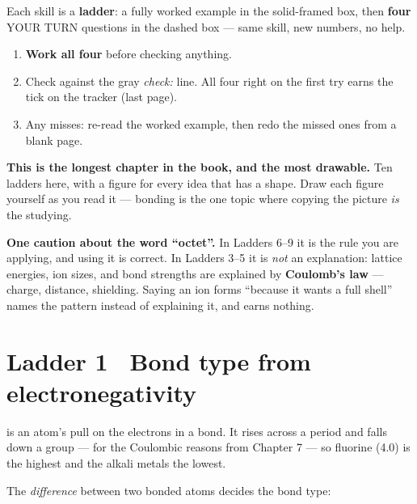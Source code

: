 \documentclass{apchem-worksheet}
\begin{document}
\apctitleblock

\begin{apcnote}
Each skill is a \textbf{ladder}: a fully worked example in the
solid-framed box, then \textbf{four} YOUR TURN questions in the dashed
box --- same skill, new numbers, no help.

\begin{enumerate}[leftmargin=*,itemsep=0.15em]
  \item \textbf{Work all four} before checking anything.
  \item Check against the gray \emph{check:} line. All four right on the
        first try earns the tick on the tracker (last page).
  \item Any misses: re-read the worked example, then redo the missed ones
        from a blank page.
\end{enumerate}

\textbf{This is the longest chapter in the book, and the most drawable.}
Ten ladders here, with a figure for every idea that has a shape. Draw
each figure yourself as you read it --- bonding is the one topic where
copying the picture \emph{is} the studying.

\textbf{One caution about the word ``octet''.} In Ladders 6--9 it is the
rule you are applying, and using it is correct. In Ladders 3--5 it is
\emph{not} an explanation: lattice energies, ion sizes, and bond
strengths are explained by \textbf{Coulomb's law} --- charge, distance,
shielding. Saying an ion forms ``because it wants a full shell'' names
the pattern instead of explaining it, and earns nothing.
\end{apcnote}

\section*{\sffamily Ladder 1 \textbullet\ Bond type from
electronegativity}

 is an atom's pull on the electrons in a bond.
It rises across a period and falls down a group --- for the Coulombic
reasons from Chapter 7 --- so fluorine (4.0) is the highest and the
alkali metals the lowest.

The \emph{difference} between two bonded atoms decides the bond type:
\end{document}
